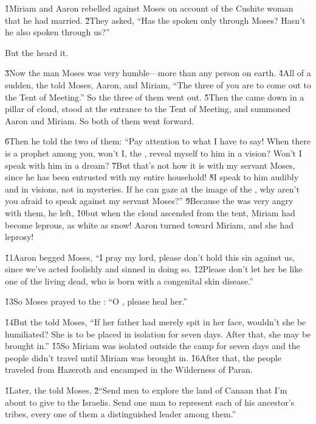 \v{1}Miriam and Aaron rebelled against Moses on account of the Cushite woman that he had married. \v{2}They asked, ``Has the  spoken only through Moses? Hasn't he also spoken through us?''

But the  heard it.

\v{3}Now the man Moses was very humble---more than any person on earth. \v{4}All of a sudden, the  told Moses, Aaron, and Miriam, ``The three of you are to come out to the Tent of Meeting.'' So the three of them went out. \v{5}Then the  came down in a pillar of cloud, stood at the entrance to the Tent of Meeting, and summoned Aaron and Miriam. So both of them went forward.

\v{6}Then he told the two of them: ``Pay attention to what I have to say! When there is a prophet among you, won't I, the , reveal myself to him in a vision? Won't I speak with him in a dream? \v{7}But that's not how it is with my servant Moses, since he has been entrusted with my entire household! \v{8}I speak to him audibly and in visions, not in mysteries. If he can gaze at the image of the , why aren't you afraid to speak against my servant Moses?'' \v{9}Because the  was very angry with them, he left, \v{10}but when the cloud ascended from the tent, Miriam had become leprous, as white as snow! Aaron turned toward Miriam, and she had leprosy!

\v{11}Aaron begged Moses, ``I pray my lord, please don't hold this sin against us, since we've acted foolishly and sinned in doing so. \v{12}Please don't let her be like one of the living dead, who is born with a congenital skin disease.''

\v{13}So Moses prayed to the : ``O , please heal her.''

\v{14}But the  told Moses, ``If her father had merely spit in her face, wouldn't she be humiliated? She is to be placed in isolation for seven days. After that, she may be brought in.'' \v{15}So Miriam was isolated outside the camp for seven days and the people didn't travel until Miriam was brought in. \v{16}After that, the people traveled from Hazeroth and encamped in the Wilderness of Paran.

\v{1}Later, the  told Moses, \v{2}``Send men to explore the land of Canaan that I'm about to give to the Israelis. Send one man to represent each of his ancestor's tribes, every one of them a distinguished leader among them.''

